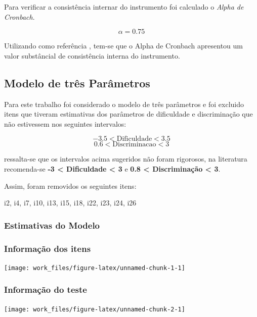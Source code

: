 \documentclass[]{article}
\begin{document}
Para verificar a consistência internar do instrumento foi calculado o
\emph{Alpha de Cronbach}.

\[\alpha = 0.75\]

Utilizando como referência \citet{landis}, tem-se que o Alpha de
Cronbach apresentou um valor substâncial de consistência interna do
instrumento.

\subsection{Modelo de três Parâmetros}\label{modelo-de-tres-parametros}

Para este trabalho foi considerado o modelo de três parâmetros e foi
excluido itens que tiveram estimativas dos parâmetros de dificuldade e
discriminação que não estivessem nos seguintes intervalos:

\[-3.5 < \text{Dificuldade} < 3.5\] \[0.6 < \text{Discriminacao} < 3\]

ressalta-se que os intervalos acima sugeridos não foram rigorosos, na
literatura recomenda-se \textbf{-3 \textless{} Dificuldade \textless{}
3} e \textbf{0.8 \textless{} Discriminação \textless{} 3}.

Assim, foram removidos os seguintes itens:

i2, i4, i7, i10, i13, i15, i18, i22, i23, i24, i26

\subsubsection{Estimativas do Modelo}\label{estimativas-do-modelo}

\subsubsection{Informação dos itens}\label{informacao-dos-itens}

\begin{center}\texttt{[image: work\_files/figure-latex/unnamed-chunk-1-1]} \end{center}

\subsubsection{Informação do teste}\label{informacao-do-teste}

\begin{center}\texttt{[image: work\_files/figure-latex/unnamed-chunk-2-1]} \end{center}
\end{document}

